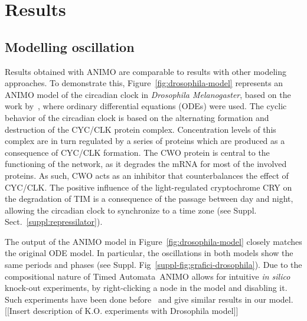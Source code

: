 \documentclass{bmcart}
\def\tas{Timed Automata}
\begin{document}
\section*{Results}\label{sec:results}
\subsection*{Modelling oscillation}\label{sec:animo-drosophila}
Results obtained with ANIMO are comparable to results with other modeling
approaches. To demonstrate this, Figure~\ref{fig:drosophila-model}
represents an ANIMO model of the circadian clock in \emph{Drosophila Melanogaster}, based on the work
by~\cite{drosophila-ode-model}, where ordinary differential equations (ODEs) were used.
The cyclic behavior of the circadian clock is based on the alternating formation and destruction of the
CYC/CLK protein complex.
Concentration levels of this complex are in turn regulated by a series of proteins which are produced as
a consequence of CYC/CLK formation. The CWO protein
is central to the functioning of the network, as it degrades the mRNA for most of the involved proteins.
As such, CWO acts as an inhibitor that counterbalances the effect of CYC/CLK.
The positive influence of the light-regulated cryptochrome CRY on the degradation of TIM is a consequence
of the passage between day and night, allowing
the circadian clock to synchronize to a time zone (see Suppl. Sect.~\ref{suppl:repressilator}).




The output of the ANIMO model in Figure~\ref{fig:drosophila-model} closely matches the original ODE model.
In particular, the oscillations in both models show the same periods and phases (see Suppl. Fig~\ref{suppl-fig:grafici-drosophila}).
Due to the compositional nature of \tas\, ANIMO allows for intuitive \emph{in silico} knock-out experiments,
by right-clicking a node in the model and disabling it. Such experiments have been done
before~\cite{drosophila-ode-model} and give similar results in our model.
\\
{\Large [[Insert description of K.O. experiments with Drosophila model]]}
\end{document}
